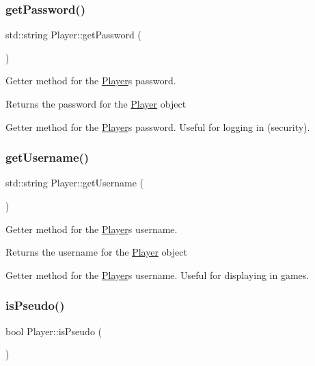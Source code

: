\subsubsection{\texorpdfstring{get\+Password()}{getPassword()}}
{\footnotesize\ttfamily std\+::string Player\+::get\+Password (\begin{DoxyParamCaption}{ }\end{DoxyParamCaption})}



Getter method for the \mbox{\hyperlink{class_player}{Player}}\textquotesingle{}s password. 

\begin{DoxyReturn}{Returns}
the password for the \mbox{\hyperlink{class_player}{Player}} object
\end{DoxyReturn}
Getter method for the \mbox{\hyperlink{class_player}{Player}}\textquotesingle{}s password. Useful for logging in (security). \mbox{\label{class_player_a73c00480e9459d52998262f23f6fc5dc}} 
\subsubsection{\texorpdfstring{get\+Username()}{getUsername()}}
{\footnotesize\ttfamily std\+::string Player\+::get\+Username (\begin{DoxyParamCaption}{ }\end{DoxyParamCaption})}



Getter method for the \mbox{\hyperlink{class_player}{Player}}\textquotesingle{}s username. 

\begin{DoxyReturn}{Returns}
the username for the \mbox{\hyperlink{class_player}{Player}} object
\end{DoxyReturn}
Getter method for the \mbox{\hyperlink{class_player}{Player}}\textquotesingle{}s username. Useful for displaying in games. \mbox{\label{class_player_a50aa73eae22ec3435d3de2e556bd1fec}} 
\subsubsection{\texorpdfstring{is\+Pseudo()}{isPseudo()}}
{\footnotesize\ttfamily bool Player\+::is\+Pseudo (\begin{DoxyParamCaption}{ }\end{DoxyParamCaption})}



